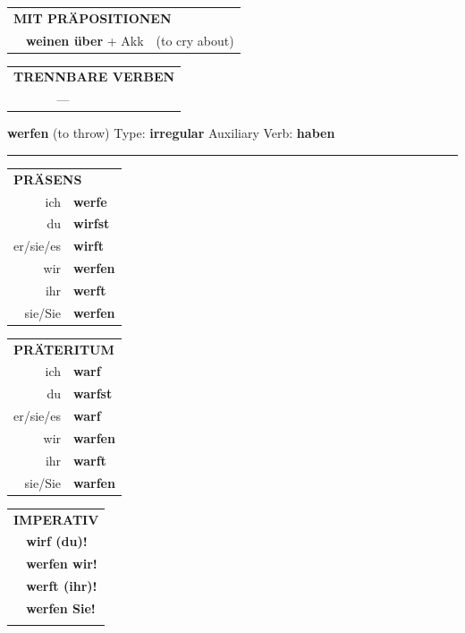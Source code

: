 \documentclass[10pt,a4paper]{revtex4-2}
\begin{document}
\begin{verbbox}
\vspace{10pt}

\begin{tabular}{lll}
\multicolumn{3}{l}{\textbf{MIT PRÄPOSITIONEN}}\\
& \textbf{weinen über} + Akk & (to cry about)\\
\end{tabular}
\hfill
\begin{tabular}{lll}
\multicolumn{3}{l}{\textbf{TRENNBARE VERBEN}}\\
& ---\\
\end{tabular}
\vspace{-5pt}
\end{verbbox}

\begin{verbbox}
    {\Large \bf werfen} (to throw) \hfill Type: \textbf{irregular} \hfill Auxiliary Verb: \textbf{haben} 
    
     \vspace{5pt}

    \hrule
    
    \vspace{5pt}

  \begin{tabular}{rl}
     \multicolumn{2}{l}{\textbf{PRÄSENS} }\\
    ich & \textbf{werfe}\\
    du & \textbf{wirfst}\\
    er/sie/es & \textbf{wirft}\\
    wir & \textbf{werfen}\\
    ihr & \textbf{werft}\\
    sie/Sie & \textbf{werfen}\\
  \end{tabular}
  \hfill
     \begin{tabular}{rl}
    \multicolumn{2}{l}{\textbf{PRÄTERITUM} }\\
    ich & \textbf{warf}\\
    du & \textbf{warfst}\\
    er/sie/es & \textbf{warf}\\
    wir & \textbf{warfen}\\
    ihr & \textbf{warft}\\
    sie/Sie & \textbf{warfen}\\
  \end{tabular}
  \hfill
  \begin{tabular}{rl}
     \multicolumn{2}{l}{\textbf{IMPERATIV} }\\
   & \textbf{wirf (du)!}\\
   & \textbf{werfen wir!}\\
   & \textbf{werft (ihr)!}\\
   & \textbf{werfen Sie!}\\
   & \vspace{10pt}
  \end{tabular}


\end{verbbox}
\end{document}
